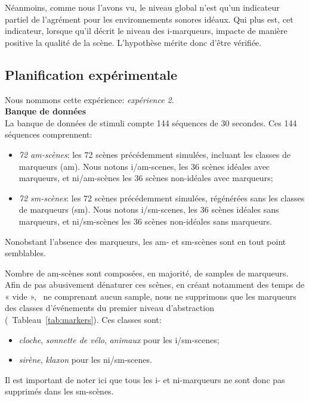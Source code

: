 Néanmoins, comme nous l'avons vu, le niveau global n'est qu'un indicateur partiel de l'agrément pour les environnements sonores idéaux. Qui plus est, cet indicateur, lorsque qu'il décrit le niveau des i-marqueurs, impacte de manière positive la qualité de la scène. L'hypothèse mérite donc d'être vérifiée.

\subsection{Planification expérimentale}

Nous nommons cette expérience: \emph{expérience 2}. \\

{\setlength{\parindent}{0cm}\textbf{Banque de données}} \\

La banque de données de stimuli compte 144 séquences de 30 secondes. Ces 144 séquences comprennent:

\begin{itemize}
\item \emph{72 am-scènes}: les 72 scènes précédemment simulées, incluant les classes de marqueurs (am). Nous notons i/am-scenes, les 36 scènes idéales avec marqueurs, et ni/am-scènes les 36 scènes non-idéales avec marqueurs;
\item \emph{72 sm-scènes}: les 72 scènes précédemment simulées, régénérées sans les classes de marqueurs (sm). Nous notons i/sm-scenes, les 36 scènes idéales sans marqueurs, et ni/sm-scènes les 36 scènes non-idéales sans marqueurs.
\end{itemize}

Nonobstant l'absence des marqueurs, les am- et sm-scènes sont en tout point semblables. 

Nombre de am-scènes sont composées, en majorité, de samples de marqueurs. Afin de pas abusivement dénaturer ces scènes, en créant notamment des temps de « vide », \ie~ne comprenant aucun sample, nous ne supprimons que les marqueurs des classes d'événements du premier niveau d'abstraction (\cf~Tableau~\ref{tab:markers}). Ces classes sont: 

\begin{itemize}
\item \emph{cloche}, \emph{sonnette de vélo}, \emph{animaux} pour les i/sm-scenes;
\item \emph{sirène}, \emph{klaxon} pour les ni/sm-scenes.
\end{itemize}
 
Il est important de noter ici que tous les i- et ni-marqueurs ne sont donc pas supprimés dans les sm-scènes. \\
 
